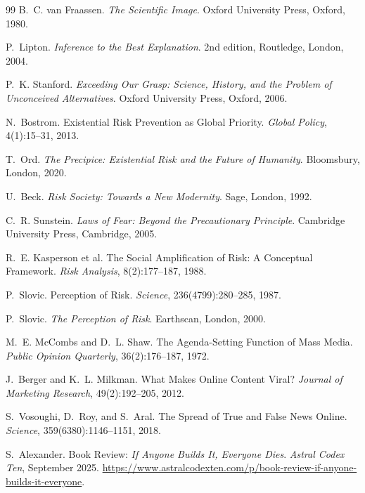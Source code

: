 \documentclass[11pt]{article}
\begin{document}
\begin{thebibliography}{99}
B.~C. van Fraassen.
\newblock \emph{The Scientific Image}.
\newblock Oxford University Press, Oxford, 1980.

P.~Lipton.
\newblock \emph{Inference to the Best Explanation}.
\newblock 2nd edition, Routledge, London, 2004.

P.~K. Stanford.
\newblock \emph{Exceeding Our Grasp: Science, History, and the Problem of
Unconceived Alternatives}.
\newblock Oxford University Press, Oxford, 2006.

N.~Bostrom.
\newblock Existential Risk Prevention as Global Priority.
\newblock \emph{Global Policy}, 4(1):15--31, 2013.

T.~Ord.
\newblock \emph{The Precipice: Existential Risk and the Future of Humanity}.
\newblock Bloomsbury, London, 2020.

U.~Beck.
\newblock \emph{Risk Society: Towards a New Modernity}.
\newblock Sage, London, 1992.

C.~R. Sunstein.
\newblock \emph{Laws of Fear: Beyond the Precautionary Principle}.
\newblock Cambridge University Press, Cambridge, 2005.

R.~E. Kasperson et al.
\newblock The Social Amplification of Risk: A Conceptual Framework.
\newblock \emph{Risk Analysis}, 8(2):177--187, 1988.

P.~Slovic.
\newblock Perception of Risk.
\newblock \emph{Science}, 236(4799):280--285, 1987.

P.~Slovic.
\newblock \emph{The Perception of Risk}.
\newblock Earthscan, London, 2000.

M.~E. McCombs and D.~L. Shaw.
\newblock The Agenda-Setting Function of Mass Media.
\newblock \emph{Public Opinion Quarterly}, 36(2):176--187, 1972.

J.~Berger and K.~L. Milkman.
\newblock What Makes Online Content Viral?
\newblock \emph{Journal of Marketing Research}, 49(2):192--205, 2012.

S.~Vosoughi, D.~Roy, and S.~Aral.
\newblock The Spread of True and False News Online.
\newblock \emph{Science}, 359(6380):1146--1151, 2018.

S.~Alexander.
\newblock Book Review: \emph{If Anyone Builds It, Everyone Dies}.
\newblock \emph{Astral Codex Ten}, September 2025.
\newblock \url{https://www.astralcodexten.com/p/book-review-if-anyone-builds-it-everyone}.


\end{thebibliography}
\end{document}
